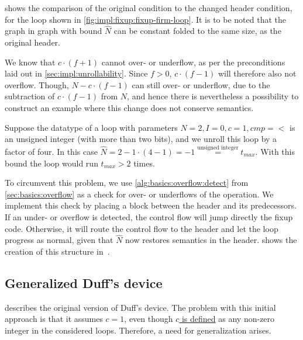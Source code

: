  shows the comparison of the original condition to the changed header condition, for the loop shown in \cref{fig:impl:fixup:fixup-firm-loop}.
It is to be noted that the graph in graph with bound $\hat{N}$ can be constant folded to the same size, as the original header.





We know that $c \cdot (f + 1)$ cannot over- or underflow, as per the preconditions laid out in \cref{sec:impl:unrollability}.
Since $f > 0$, $c \cdot (f - 1)$ will therefore also not overflow.
Though, $N - c \cdot (f - 1)$ can still over- or underflow, due to the subtraction of $c \cdot (f - 1)$ from $N$, and hence there is nevertheless a possibility to construct an example where this change does not conserve semantics.

Suppose the datatype of a loop with parameters $N = 2, I = 0, c = 1, cmp = <$ is an unsigned integer (with more than two bits), and we unroll this loop by a factor of four.
In this case $\hat{N} = 2 - 1 \cdot (4 - 1) = -1 \overset{\text{unsigned integer}}{=} t_{max}$.
With this bound the loop would run $t_{max} > 2$ times.

To circumvent this problem, we use \cref{alg:basics:overflow:detect} from \cref{sec:basics:overflow} as a check for over- or underflows of the operation.
We implement this check by placing a block between the header and its predecessors.
If an under- or overflow is detected, the control flow will jump directly the fixup code.
Otherwise, it will route the control flow to the header and let the loop progress as normal, given that $\hat{N}$ now restores semantics in the header.
 shows the creation of this structure in~\libFIRM.



\subsection{Generalized Duff's device}\label{sec:impl:fixup:duff}

 describes the original version of Duff's device.
The problem with this initial approach is that it assumes $c = 1$, even though \hyperref[sec:impl::def-c]{$c$ is defined} as any non-zero integer in the considered loops.
Therefore, a need for generalization arises.

